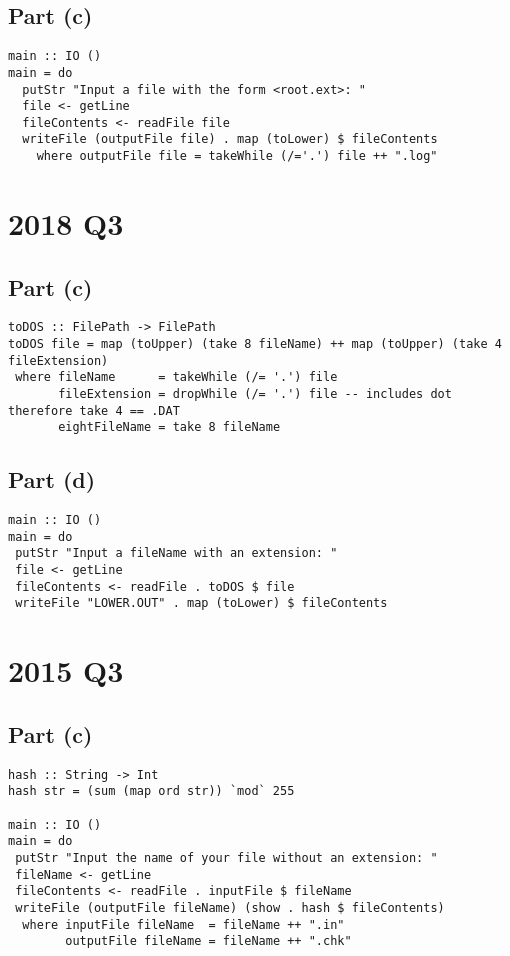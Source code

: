 \documentclass[11pt]{article}
\begin{document}
\subsection{Part (c)}
\label{sec:org588d7a6}
\begin{verbatim}
main :: IO ()
main = do
  putStr "Input a file with the form <root.ext>: "
  file <- getLine
  fileContents <- readFile file
  writeFile (outputFile file) . map (toLower) $ fileContents
    where outputFile file = takeWhile (/='.') file ++ ".log"
\end{verbatim}
\newpage
\section{2018 Q3}
\label{sec:org77b5ddf}
\subsection{Part (c)}
\label{sec:orgce3d31e}
\begin{verbatim}
toDOS :: FilePath -> FilePath
toDOS file = map (toUpper) (take 8 fileName) ++ map (toUpper) (take 4 fileExtension)
 where fileName      = takeWhile (/= '.') file
       fileExtension = dropWhile (/= '.') file -- includes dot therefore take 4 == .DAT
       eightFileName = take 8 fileName

\end{verbatim}
\subsection{Part (d)}
\label{sec:org4775c0f}
\begin{verbatim}
main :: IO ()
main = do
 putStr "Input a fileName with an extension: "
 file <- getLine
 fileContents <- readFile . toDOS $ file
 writeFile "LOWER.OUT" . map (toLower) $ fileContents
\end{verbatim}
\section{2015 Q3}
\label{sec:orga32876c}
\subsection{Part (c)}
\label{sec:orgd019baa}
\begin{verbatim}
hash :: String -> Int
hash str = (sum (map ord str)) `mod` 255

main :: IO ()
main = do
 putStr "Input the name of your file without an extension: "
 fileName <- getLine
 fileContents <- readFile . inputFile $ fileName
 writeFile (outputFile fileName) (show . hash $ fileContents)
  where inputFile fileName  = fileName ++ ".in"
        outputFile fileName = fileName ++ ".chk"
\end{verbatim}
\end{document}

